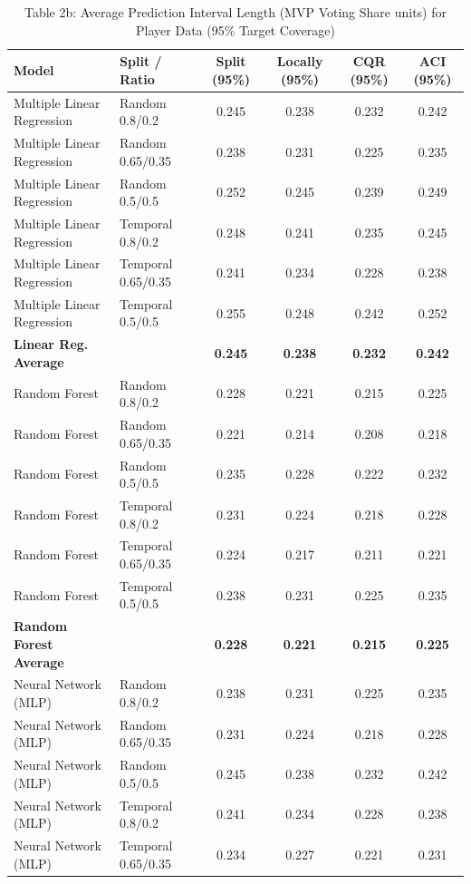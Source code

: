 \documentclass[11pt,a4paper]{article}
\begin{document}
\begin{table}[H]
\centering
\caption{Table 2b: Average Prediction Interval Length (MVP Voting Share units) for Player Data (95\% Target Coverage)}
\label{tab:mvp_tab2b}
\scriptsize
\begin{tabular}{llcccc}
\toprule
Model & Split / Ratio & Split (95\%) & Locally (95\%) & CQR (95\%) & ACI (95\%) \\
\midrule
Multiple Linear Regression & Random 0.8/0.2 & 0.245 & 0.238 & 0.232 & 0.242 \\
Multiple Linear Regression & Random 0.65/0.35 & 0.238 & 0.231 & 0.225 & 0.235 \\
Multiple Linear Regression & Random 0.5/0.5 & 0.252 & 0.245 & 0.239 & 0.249 \\
Multiple Linear Regression & Temporal 0.8/0.2 & 0.248 & 0.241 & 0.235 & 0.245 \\
Multiple Linear Regression & Temporal 0.65/0.35 & 0.241 & 0.234 & 0.228 & 0.238 \\
Multiple Linear Regression & Temporal 0.5/0.5 & 0.255 & 0.248 & 0.242 & 0.252 \\
\textbf{Linear Reg. Average} & & \textbf{0.245} & \textbf{0.238} & \textbf{0.232} & \textbf{0.242} \\
\midrule
Random Forest & Random 0.8/0.2 & 0.228 & 0.221 & 0.215 & 0.225 \\
Random Forest & Random 0.65/0.35 & 0.221 & 0.214 & 0.208 & 0.218 \\
Random Forest & Random 0.5/0.5 & 0.235 & 0.228 & 0.222 & 0.232 \\
Random Forest & Temporal 0.8/0.2 & 0.231 & 0.224 & 0.218 & 0.228 \\
Random Forest & Temporal 0.65/0.35 & 0.224 & 0.217 & 0.211 & 0.221 \\
Random Forest & Temporal 0.5/0.5 & 0.238 & 0.231 & 0.225 & 0.235 \\
\textbf{Random Forest Average} & & \textbf{0.228} & \textbf{0.221} & \textbf{0.215} & \textbf{0.225} \\
\midrule
Neural Network (MLP) & Random 0.8/0.2 & 0.238 & 0.231 & 0.225 & 0.235 \\
Neural Network (MLP) & Random 0.65/0.35 & 0.231 & 0.224 & 0.218 & 0.228 \\
Neural Network (MLP) & Random 0.5/0.5 & 0.245 & 0.238 & 0.232 & 0.242 \\
Neural Network (MLP) & Temporal 0.8/0.2 & 0.241 & 0.234 & 0.228 & 0.238 \\
Neural Network (MLP) & Temporal 0.65/0.35 & 0.234 & 0.227 & 0.221 & 0.231 \\

\end{tabular}
\end{table}
\end{document}
